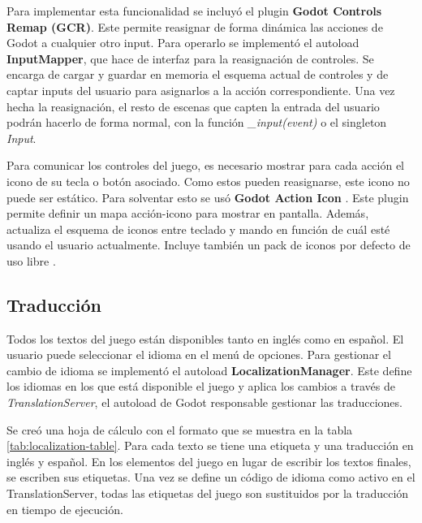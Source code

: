 Para implementar esta funcionalidad se incluyó el plugin \textbf{Godot Controls Remap (GCR)}\cite{controls-remap}. Este permite reasignar de forma dinámica las acciones de Godot a cualquier otro input. Para operarlo se implementó el autoload \textbf{InputMapper}, que hace de interfaz para la reasignación de controles. Se encarga de cargar y guardar en memoria el esquema actual de controles y de captar inputs del usuario para asignarlos a la acción correspondiente. Una vez hecha la reasignación, el resto de escenas que capten la entrada del usuario podrán hacerlo de forma normal, con la función \textit{\_input(event)} o el singleton \textit{Input}.

Para comunicar los controles del juego, es necesario mostrar para cada acción el icono de su tecla o botón asociado. Como estos pueden reasignarse, este icono no puede ser estático. Para solventar esto se usó \textbf{Godot Action Icon} \cite{action-icon}. Este plugin permite definir un mapa acción-icono para mostrar en pantalla. Además, actualiza el esquema de iconos entre teclado y mando en función de cuál esté usando el usuario actualmente. Incluye también un pack de iconos por defecto de uso libre \cite{icon-pack}.

\subsection{Traducción}

Todos los textos del juego están disponibles tanto en inglés como en español. El usuario puede seleccionar el idioma en el menú de opciones. Para gestionar el cambio de idioma se implementó el autoload \textbf{LocalizationManager}. Este define los idiomas en los que está disponible el juego y aplica los cambios a través de \textit{TranslationServer}, el autoload de Godot responsable gestionar las traducciones. 

Se creó una hoja de cálculo con el formato que se muestra en la tabla \ref{tab:localization-table}. Para cada texto se tiene una etiqueta y una traducción en inglés y español. En los elementos del juego en lugar de escribir los textos finales, se escriben sus etiquetas. Una vez se define un código de idioma como activo en el TranslationServer, todas las etiquetas del juego son sustituidos por la traducción en tiempo de ejecución.

